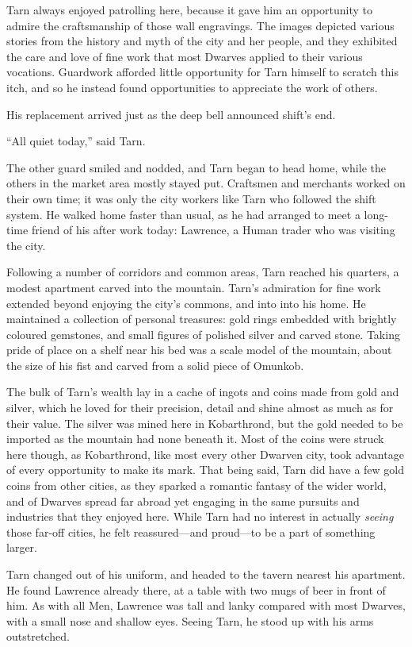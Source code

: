 Tarn always enjoyed patrolling here, because it gave him an opportunity to admire the craftsmanship of those wall engravings.  The images depicted various stories from the history and myth of the city and her people, and they exhibited the care and love of fine work that most Dwarves applied to their various vocations.  Guardwork afforded little opportunity for Tarn himself to scratch this itch, and so he instead found opportunities to appreciate the work of others.

His replacement arrived just as the deep bell announced shift's end.

``All quiet today,'' said Tarn.

The other guard smiled and nodded, and Tarn began to head home, while the others in the market area mostly stayed put.  Craftsmen and merchants worked on their own time; it was only the city workers like Tarn who followed the shift system.  He walked home faster than usual, as he had arranged to meet a long-time friend of his after work today: Lawrence, a Human trader who was visiting the city.

Following a number of corridors and common areas, Tarn reached his quarters, a modest apartment carved into the mountain.
Tarn's admiration for fine work extended beyond enjoying the city's commons, and into into his home.  He maintained a collection of personal treasures: gold rings embedded with brightly coloured gemstones, and small figures of polished silver and carved stone.  Taking pride of place on a shelf near his bed was a scale model of the mountain, about the size of his fist and carved from a solid piece of Omunkob.

The bulk of Tarn's wealth lay in a cache of ingots and coins made from gold and silver, which he loved for their precision, detail and shine almost as much as for their value.  The silver was mined here in Kobarthrond, but the gold needed to be imported as the mountain had none beneath it.  Most of the coins were struck here though, as Kobarthrond, like most every other Dwarven city, took advantage of every opportunity to make its mark.  That being said, Tarn did have a few gold coins from other cities, as they sparked a romantic fantasy of the wider world, and of Dwarves spread far abroad yet engaging in the same pursuits and industries that they enjoyed here.  While Tarn had no interest in actually \emph{seeing} those far-off cities, he felt reassured---and proud---to be a part of something larger.

Tarn changed out of his uniform, and headed to the tavern nearest his apartment.  He found Lawrence already there, at a table with two mugs of beer in front of him.  As with all Men, Lawrence was tall and lanky compared with most Dwarves, with a small nose and shallow eyes.  Seeing Tarn, he stood up with his arms outstretched.

